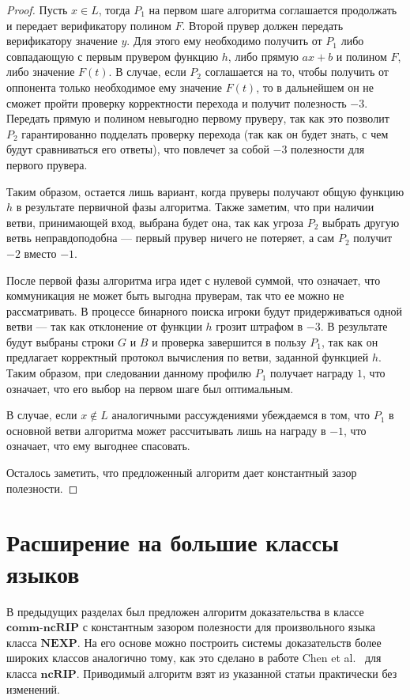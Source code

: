 \documentclass[14pt, a4paper]{extreport}
\begin{document}
\begin{proof}
        Пусть $x \in L$, тогда $P_1$ на первом шаге алгоритма соглашается продолжать и передает верификатору полином $F$. Второй прувер должен передать верификатору значение $y$. Для этого ему необходимо получить от $P_1$ либо совпадающую с первым прувером функцию $h$, либо прямую $a x + b$ и полином $F$, либо значение $F(t)$. В случае, если $P_2$ соглашается на то, чтобы получить от оппонента только необходимое ему значение $F(t)$, то в дальнейшем он не сможет пройти проверку корректности перехода и получит полезность $-3$. Передать прямую и полином невыгодно первому пруверу, так как это позволит $P_2$ гарантированно подделать проверку перехода (так как он будет знать, с чем будут сравниваться его ответы), что повлечет за собой $-3$ полезности для первого прувера.

        Таким образом, остается лишь вариант, когда пруверы получают общую функцию $h$ в результате первичной фазы алгоритма. Также заметим, что при наличии ветви, принимающей вход, выбрана будет она, так как угроза $P_2$ выбрать другую ветвь неправдоподобна --- первый прувер ничего не потеряет, а сам $P_2$ получит $-2$ вместо $-1$.

        После первой фазы алгоритма игра идет с нулевой суммой, что означает, что коммуникация не может быть выгодна пруверам, так что ее можно не рассматривать. В процессе бинарного поиска игроки будут придерживаться одной ветви --- так как отклонение от функции $h$ грозит штрафом в $-3$. В результате будут выбраны строки $G$ и $B$ и проверка завершится в пользу $P_1$, так как он предлагает корректный протокол вычисления по ветви, заданной функцией $h$. Таким образом, при следовании данному профилю $P_1$ получает награду $1$, что означает, что его выбор на первом шаге был оптимальным.

        В случае, если $x \notin L$ аналогичными рассуждениями убеждаемся в том, что $P_1$ в основной ветви алгоритма может рассчитывать лишь на награду в $-1$, что означает, что ему выгоднее спасовать.

        Осталось заметить, что предложенный алгоритм дает константный зазор полезности.
    \end{proof}
        \section{Расширение на большие классы языков}
        В предыдущих разделах был предложен алгоритм доказательства в классе $\textbf{comm-ncRIP}$ с константным зазором полезности для произвольного языка класса $\textbf{NEXP}$. На его основе можно построить системы доказательств более широких классов аналогично тому, как это сделано в работе Chen et al.~\cite{chen2017noncoop} для класса $\textbf{ncRIP}$. Приводимый алгоритм взят из указанной статьи практически без изменений.
\end{document}
